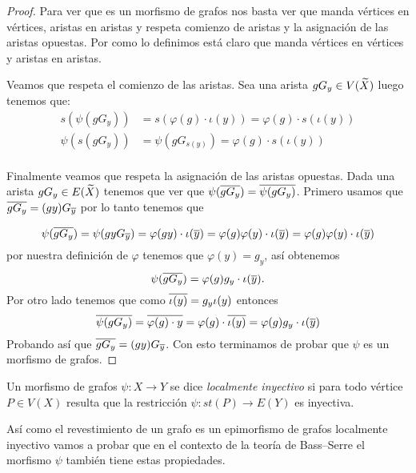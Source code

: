 \documentclass[tesis.tex]{subfiles}
\begin{document}
\begin{proof}
Para ver que es un morfismo de grafos nos basta ver que manda vértices en vértices, aristas en aristas y respeta comienzo de aristas y la asignación de las aristas opuestas.
Por como lo definimos está claro que manda vértices en vértices y aristas en aristas.

Veamos que respeta el comienzo de las aristas.
Sea una arista $gG_y \in V(\widetilde X)$ luego tenemos que:
\begin{align*}
s(\psi(gG_y  )) &= s (\varphi(g) \cdot \iota(y)) =  \varphi(g) \cdot  s(\iota(y)) 	\\ 
\psi(s(gG_y ))  &= \psi(gG_{s(y)} ) = \varphi(g) \cdot {s(\iota(y))} \\
\end{align*}	

Finalmente veamos que respeta la asignación de las aristas opuestas.	
Dada una arista $g G_y \in E(\widetilde X)$ tenemos que ver que $\psi(\overline{g G_y }) = \overline{\psi(g G_y )}$.	
Primero usamos que $\overline{g G_y } = (gy)G_{\overline y}$ por lo tanto tenemos que 

\[
	\psi(\overline{gG_y  }) = \psi(gyG_{\overline y}) = \varphi(gy) \cdot \iota(\overline y)  = \varphi(g)\varphi(y) \cdot \iota(\overline y) = \varphi(g)\varphi(y) \cdot \iota(\overline y)      	
\]
por nuestra definición de $\varphi$ tenemos que $\varphi(y) = g_{y}$, así obtenemos
\[
	\psi(\overline{gG_y  }) =  \varphi(g) g_y \cdot \iota(\overline y). 
\]
Por otro lado tenemos que como $\overline{\iota(y)} = g_{y}\iota(y)$ entonces
\[
	\overline{\psi(gG_y )} = \overline{ \varphi(g) \cdot  y } = \varphi(g) \cdot  \overline{\iota( y)} = \varphi(g)g_{y} \cdot \iota(\overline y) 
\]
Probando así que $ \overline{g G_y } = (gy)G_{\overline y} $.
Con esto terminamos de probar que $\psi$ es un morfismo de grafos.

\end{proof}


\begin{deff}
	Un morfismo de grafos $\psi:X \to Y$ se dice \emph{localmente inyectivo} si para todo vértice $P \in V(X)$ resulta que la restricción $\psi: st(P) \to E(Y)$ es inyectiva. 
\end{deff}

Así como el revestimiento de un grafo es un epimorfismo de grafos localmente inyectivo vamos a probar que en el contexto de la teoría de Bass--Serre el morfismo $\psi$ también tiene estas propiedades.
\end{document}
